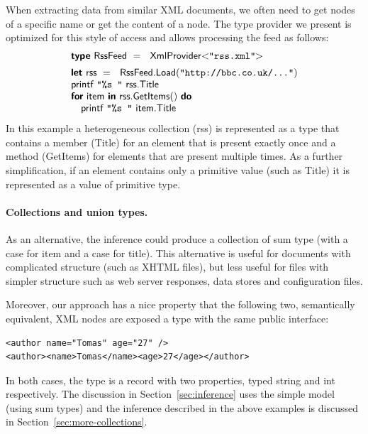 \documentclass[10pt]{sigplanconf}
\newcommand{\kvd}[1]{\textbf{\sffamily #1}}
\newcommand{\ident}[1]{\textnormal{\sffamily #1}}
\newcommand{\str}[1]{\texttt{#1}}
\newcommand{\rangl}{\hspace{-0.3em}>\hspace{-0.25em}}
\newcommand{\langl}{\hspace{-0.25em}<\hspace{-0.3em}}
\begin{document}
When extracting data from similar XML documents, we often need to get nodes of a specific name
or get the content of a node. The type provider we present is optimized for this style of access
and allows processing the feed as follows:
%
\begin{equation*}
\begin{array}{l}
\kvd{type}~\ident{RssFeed}~=~\ident{XmlProvider}\langl\str{"rss.xml"}\rangl\hspace{1em} \\[0.5em]
\kvd{let}~\ident{rss}~=~\ident{RssFeed.Load}(\str{"http://bbc.co.uk/..."})\\
\ident{printf}~\str{"\%s "}~\ident{rss.Title}\\
\kvd{for}~\ident{item}~\kvd{in}~\ident{rss.GetItems}()~\kvd{do}\\
\quad\ident{printf}~\str{"\%s "}~\ident{item.Title}\\
\end{array}
\end{equation*}
%
In this example a heterogeneous collection (\ident{rss}) is represented as a type that contains
a member (\ident{Title}) for an element that is present exactly once and a method 
(\ident{GetItems}) for elements that are present multiple times. As a further simplification,
if an element contains only a primitive value (such as \ident{Title}) it is represented as a 
value of primitive type.

\paragraph{Collections and union types.}
As an alternative, the inference could produce a collection of sum type (with a case for \ident{item}
and a case for \ident{title}). This alternative is useful for documents with complicated structure 
(such as XHTML files), but less useful for files with simpler structure such as web server responses,
data stores and configuration files. 

Moreover, our approach has a nice property that the following two, semantically equivalent, XML 
nodes are exposed a type with the same public interface:
%
{\small{
\begin{verbatim}
<author name="Tomas" age="27" />
<author><name>Tomas</name><age>27</age></author>
\end{verbatim}
}}
%
\noindent
In both cases, the type is a record with two properties, typed \ident{string} and \ident{int} 
respectively. The discussion in Section~\ref{sec:inference} uses the simple model (using sum types)
and the inference described in the above examples is discussed in Section~\ref{sec:more-collections}.
\end{document}
